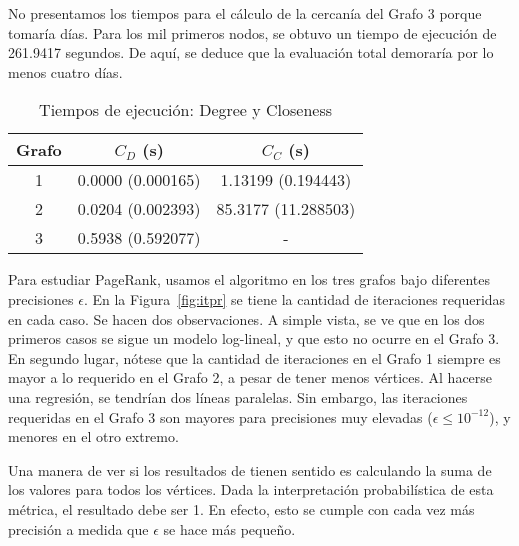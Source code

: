 \documentclass[journal]{IEEEtran}
\let\MYoriglatexcaption\caption
\renewcommand{\caption}[2][\relax]{\MYoriglatexcaption[#2]{#2}}
\begin{document}
No presentamos los tiempos para el cálculo de la cercanía del Grafo 3 porque tomaría días. Para los mil primeros nodos, se obtuvo un tiempo de ejecución de \num{261.9417} segundos. De aquí, se deduce que la evaluación total demoraría por lo menos cuatro días.

\begin{table}
	\renewcommand{\arraystretch}{1.3}
	\caption{Tiempos de ejecución: Degree y Closeness}
	\label{tab:tejecucion}
	\centering
	\begin{tabular}{c|c|c}
		\hline
		Grafo & \(C_D\) (s) & \(C_C\) (s) \\
		\hline\hline
		1 & 0.0000 (0.000165) & 1.13199 (0.194443) \\
		2 & 0.0204 (0.002393) & 85.3177 (11.288503) \\
		3 & 0.5938 (0.592077) & - \\
		\hline
	\end{tabular}
\end{table}

Para estudiar PageRank, usamos el algoritmo en los tres grafos bajo diferentes precisiones \(\epsilon\). En la Figura~\ref{fig:itpr} se tiene la cantidad de iteraciones requeridas en cada caso. Se hacen dos observaciones. A simple vista, se ve que en los dos primeros casos se sigue un modelo log-lineal, y que esto no ocurre en el Grafo 3. En segundo lugar, nótese que la cantidad de iteraciones en el Grafo 1 siempre es mayor a lo requerido en el Grafo 2, a pesar de tener menos vértices. Al hacerse una regresión, se tendrían dos líneas paralelas. Sin embargo, las iteraciones requeridas en el Grafo 3 son mayores para precisiones muy elevadas (\(\epsilon \leq 10^{-12} \)), y menores en el otro extremo.

Una manera de ver si los resultados de  tienen sentido es calculando la suma de los valores para todos los vértices. Dada la interpretación probabilística de esta métrica, el resultado debe ser 1. En efecto, esto se cumple con cada vez más precisión a medida que \(\epsilon\) se hace más pequeño.
\end{document}
